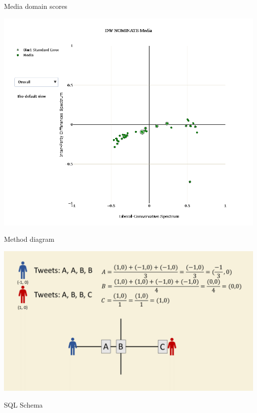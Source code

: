 \documentclass[12pt]{article}
\theoremstyle{example}
\theoremstyle{defn}
\begin{document}
\clearpage

{\large Media domain scores}

\vspace*{-5pt}
\hspace*{\fill}
\includegraphics[scale=0.2]{media_pic_white.png}
\hspace*{\fill}

\clearpage

Method diagram

\hspace*{\fill}
\includegraphics[scale=0.25]{method_visual2.png}
\hspace*{\fill}

\clearpage


SQL Schema
\end{document}
